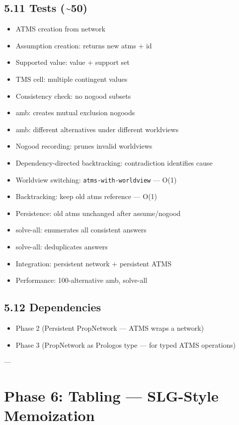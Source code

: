 \documentclass[11pt]{article}
\begin{document}
\subsection{5.11 Tests (\textasciitilde{}50)}
\label{sec:orgcb90f6b}

\begin{itemize}
\item ATMS creation from network
\item Assumption creation: returns new atms + id
\item Supported value: value + support set
\item TMS cell: multiple contingent values
\item Consistency check: no nogood subsets
\item amb: creates mutual exclusion nogoods
\item amb: different alternatives under different worldviews
\item Nogood recording: prunes invalid worldviews
\item Dependency-directed backtracking: contradiction identifies cause
\item Worldview switching: \texttt{atms-with-worldview} — O(1)
\item Backtracking: keep old atms reference — O(1)
\item Persistence: old atms unchanged after assume/nogood
\item solve-all: enumerates all consistent answers
\item solve-all: deduplicates answers
\item Integration: persistent network + persistent ATMS
\item Performance: 100-alternative amb, solve-all
\end{itemize}
\subsection{5.12 Dependencies}
\label{sec:orgde663dc}

\begin{itemize}
\item Phase 2 (Persistent PropNetwork — ATMS wraps a network)
\item Phase 3 (PropNetwork as Prologos type — for typed ATMS operations)
\end{itemize}

---
\section{Phase 6: Tabling — SLG-Style Memoization}
\label{sec:org56a0cf3}
\end{document}
